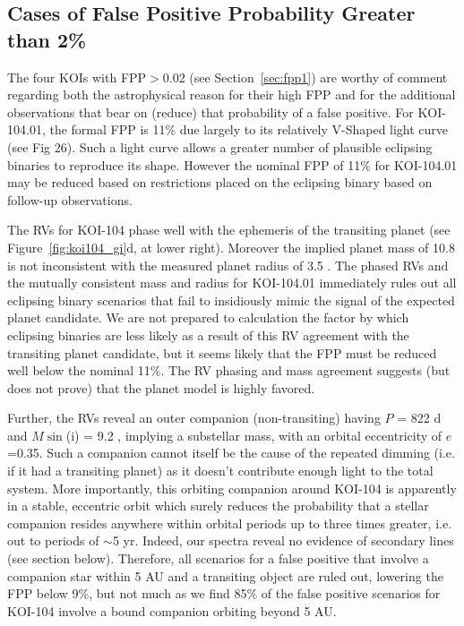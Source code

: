 \documentclass{emulateapj}
\begin{document}
\subsection{Cases of False Positive Probability Greater than 2\%}
 \label{sec:fpp3}

The four KOIs with FPP$>$0.02 (see Section~\ref{sec:fpp1}) are worthy
 of comment regarding both the astrophysical reason for their high FPP
 and for the additional observations that bear on (reduce) that
 probability of a false positive.  For KOI-104.01, the formal FPP is 11\% due
 largely to its relatively V-Shaped light curve (see Fig 26).  Such a
 light curve allows a greater number of plausible eclipsing binaries
 to reproduce its shape.  However the nominal FPP of 11\% for
 KOI-104.01 may be reduced based on restrictions placed on the eclipsing binary based on follow-up observations.  

The RVs for KOI-104 phase well with the ephemeris of the \ek transiting planet (see Figure~\ref{fig:koi104_gi}d, at lower right).  Moreover the implied planet mass of 10.8 \mearth is not inconsistent with the measured planet radius of 3.5 \rearth.  The phased RVs and the mutually consistent mass and radius for KOI-104.01 immediately rules out all eclipsing binary scenarios that fail to insidiously mimic the signal of the expected planet candidate.  We are not prepared to calculation the factor by which eclipsing binaries are less likely as a result of this RV agreement with the \ek transiting planet candidate, but it seems likely that the FPP must be reduced well below the nominal 11\%.  
The RV phasing and mass agreement suggests (but does not prove) that the planet model is highly favored.

Further, the RVs reveal an outer companion (non-transiting) having $P$ = 822 d and $M\sin$(i)
 = 9.2 \mjup, implying a substellar mass, with an orbital eccentricity
 of $e$=0.35.  Such a companion cannot itself be the cause of the
 repeated dimming (i.e. if it had a transiting planet) as it doesn't
 contribute enough light to the total system.  More importantly, this
 orbiting companion around KOI-104 is apparently in a stable,
 eccentric orbit which surely reduces the probability that a stellar
 companion resides anywhere within orbital periods up to three times
 greater, i.e. out to periods of $\sim$5 yr.  Indeed, our spectra
 reveal no evidence of secondary lines (see section below).
  Therefore, all scenarios for a false positive that involve a
 companion star within 5 AU and a transiting object are ruled out,
 lowering the FPP below 9\%, but not much as we find 85\% of the false
 positive scenarios for KOI-104 involve a bound companion orbiting
 beyond 5 AU.
\end{document}
